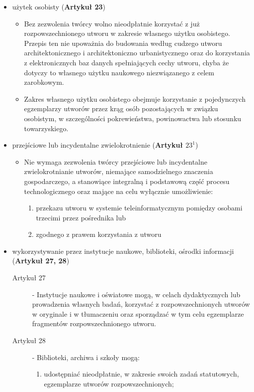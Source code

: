 \documentclass[12pt,a4paper]{article}
\begin{document}
\begin{itemize}
\item użytek osobisty (\textbf{Artykuł 23})
	\begin{itemize}
		 \item  Bez zezwolenia twórcy wolno nieodpłatnie korzystać z już rozpowszechnionego 		utworu w zakresie własnego użytku osobistego. Przepis ten nie upoważnia do budowania 		według cudzego utworu architektonicznego i architektoniczno urbanistycznego 		oraz do korzystania z elektronicznych baz danych spełniających 		cechy utworu, chyba że dotyczy to własnego użytku naukowego niezwiązanego z 		celem zarobkowym.
		 \item Zakres własnego użytku osobistego obejmuje korzystanie z pojedynczych egzemplarzy 		utworów przez krąg osób pozostających w związku osobistym, w szczególności 		pokrewieństwa, powinowactwa lub stosunku towarzyskiego.
	\end{itemize}
\item przejściowe lub incydentalne zwielokrotnienie (\textbf{Artykuł $23^1$})
	\begin{itemize}
		\item Nie wymaga zezwolenia twórcy przejściowe lub incydentalne zwielokrotnianie 		utworów, niemające samodzielnego znaczenia gospodarczego, a stanowiące integralną 		i podstawową część procesu technologicznego oraz mające na celu wyłącznie umożliwienie:
		\begin{enumerate}
				\item przekazu utworu w systemie teleinformatycznym pomiędzy osobami trzecimi 		przez pośrednika lub
				\item zgodnego z prawem korzystania z utworu
		\end{enumerate}
	\end{itemize}
\item wykorzystywanie przez instytucje naukowe, biblioteki, ośrodki informacji (\textbf{Artykuł 27, 28})
	\begin{description}
		\item[Artykuł 27] - Instytucje naukowe i oświatowe mogą, w celach dydaktycznych lub prowadzenia własnych badań, korzystać z rozpowszechnionych utworów w oryginale i w tłumaczeniu oraz sporządzać w tym celu egzemplarze fragmentów rozpowszechnionego utworu.
		\item[Artykuł 28] - Biblioteki, archiwa i szkoły mogą:
			\begin{enumerate}
					\item udostępniać nieodpłatnie, w zakresie swoich zadań statutowych, egzemplarze 				utworów rozpowszechnionych;

\end{enumerate}
\end{description}
\end{itemize}
\end{document}
